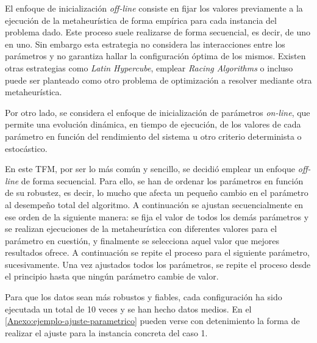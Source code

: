 El enfoque de inicialización \textit{off-line} consiste en fijar los valores previamente a la ejecución de la metaheurística de forma empírica para cada instancia del problema dado. Este proceso suele realizarse de forma secuencial, es decir, de uno en uno. Sin embargo esta estrategia no considera las interacciones entre los parámetros y no garantiza hallar la configuración óptima de los mismos. Existen otras estrategias como \textit{Latin Hypercube}, emplear \textit{Racing Algorithms} o incluso puede ser planteado como otro problema de optimización a resolver mediante otra metaheurística.

Por otro lado, se considera el enfoque de inicialización de parámetros \textit{on-line}, que permite una evolución dinámica, en tiempo de ejecución, de los valores de cada parámetro en función del rendimiento del sistema u otro criterio determinista o estocástico.

En este TFM, por ser lo más común y sencillo, se decidió emplear un enfoque \textit{off-line} de forma secuencial. Para ello, se han de ordenar los parámetros en función de su robustez, es decir, lo mucho que afecta un pequeño cambio en el parámetro al desempeño total del algoritmo. A continuación se ajustan secuencialmente en ese orden de la siguiente manera: se fija el valor de todos los demás parámetros y se realizan ejecuciones de la metaheurística con diferentes valores para el parámetro en cuestión, y finalmente se selecciona aquel valor que mejores resultados ofrece. A continuación se repite el proceso para el siguiente parámetro, sucesivamente.
Una vez ajustados todos los parámetros, se repite el proceso desde el principio hasta que ningún parámetro cambie de valor.

Para que los datos sean más robustos y fiables, cada configuración ha sido ejecutada un total de 10 veces y se han hecho datos medios. En el \autoref{Anexo:ejemplo-ajuste-parametrico} pueden verse con detenimiento la forma de realizar el ajuste para la instancia concreta del caso 1. %


